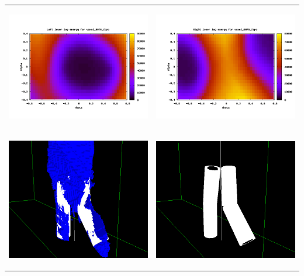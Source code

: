 \documentclass[12pt,a4paper]{article}
\begin{document}
\begin{tabular}{p{9cm} p{9cm}}
	\begin{center}\includegraphics[width=9cm]{good-leftlower.png}\end{center}&
	\begin{center}\includegraphics[width=9cm]{good-rightlower.png}\end{center}\\
	
	\begin{center}\includegraphics[width=7cm]{good-3d.png}\end{center}&
	\begin{center}\includegraphics[width=7cm]{good-model.png}\end{center}\\
\end{tabular}
\end{document}
